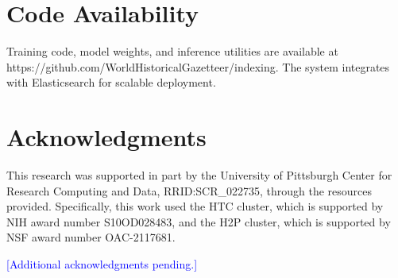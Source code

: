 \documentclass[11pt,a4paper]{article}
\newcommand{\placeholder}[1]{\textcolor{blue}{[#1]}}
\begin{document}
\section*{Code Availability}

Training code, model weights, and inference utilities are available at https://github.com/WorldHistoricalGazetteer/indexing. The system integrates with Elasticsearch for scalable deployment.

\section*{Acknowledgments}

This research was supported in part by the University of Pittsburgh Center for Research Computing and Data, RRID:SCR\_022735, through the resources provided. Specifically, this work used the HTC cluster, which is supported by NIH award number S10OD028483, and the H2P cluster, which is supported by NSF award number OAC-2117681.

\placeholder{Additional acknowledgments pending.}




\end{document}
